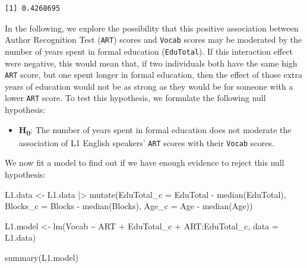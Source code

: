 \documentclass[
  letterpaper,
  DIV=11,
  numbers=noendperiod]{scrreprt}
\newenvironment{Shaded}{\begin{snugshade}}{\end{snugshade}}
\newcommand{\AttributeTok}[1]{\textcolor[rgb]{0.40,0.45,0.13}{#1}}
\newcommand{\FunctionTok}[1]{\textcolor[rgb]{0.28,0.35,0.67}{#1}}
\newcommand{\NormalTok}[1]{\textcolor[rgb]{0.00,0.23,0.31}{#1}}
\newcommand{\OtherTok}[1]{\textcolor[rgb]{0.00,0.23,0.31}{#1}}
\newcommand{\SpecialCharTok}[1]{\textcolor[rgb]{0.37,0.37,0.37}{#1}}
\providecommand{\tightlist}{%
  \setlength{\itemsep}{0pt}\setlength{\parskip}{0pt}}
\newcommand*\circled[1]{\tikz[baseline=(char.base)]{
          \node[shape=circle,draw,inner sep=1pt] (char) {{\scriptsize#1}};}}
\begin{document}
\begin{Shaded}
\end{Shaded}

\begin{verbatim}
[1] 0.4268695
\end{verbatim}

In the following, we explore the possibility that this positive
association between Author Recognition Test (\texttt{ART}) scores and
\texttt{Vocab} scores may be moderated by the number of years spent in
formal education (\texttt{EduTotal}). If this interaction effect were
negative, this would mean that, if two individuals both have the same
high \texttt{ART} score, but one spent longer in formal education, then
the effect of those extra years of education would not be as strong as
they would be for someone with a lower \texttt{ART} score. To test this
hypothesis, we formulate the following null hypothesis:

\begin{itemize}
\tightlist
\item
  \textbf{H\textsubscript{0}}: The number of years spent in formal
  education does not moderate the association of L1 English speakers'
  \texttt{ART} scores with their \texttt{Vocab} scores.
\end{itemize}

We now fit a model to find out if we have enough evidence to reject this
null hypothesis:

\protect{}\label{annotated-cell-280}%
\begin{Shaded}
\begin{Highlighting}[]
\NormalTok{L1.data }\OtherTok{\textless{}{-}}\NormalTok{ L1.data }\SpecialCharTok{|\textgreater{}} \hspace*{\fill}\NormalTok{\circled{1}}
   \FunctionTok{mutate}\NormalTok{(}\AttributeTok{EduTotal\_c =}\NormalTok{ EduTotal }\SpecialCharTok{{-}} \FunctionTok{median}\NormalTok{(EduTotal),}
          \AttributeTok{Blocks\_c =}\NormalTok{ Blocks }\SpecialCharTok{{-}} \FunctionTok{median}\NormalTok{(Blocks),}
          \AttributeTok{Age\_c =}\NormalTok{ Age }\SpecialCharTok{{-}} \FunctionTok{median}\NormalTok{(Age))}

\NormalTok{L1.model }\OtherTok{\textless{}{-}} \FunctionTok{lm}\NormalTok{(Vocab }\SpecialCharTok{\textasciitilde{}}\NormalTok{ ART }\SpecialCharTok{+}\NormalTok{ EduTotal\_c }\SpecialCharTok{+}\NormalTok{ ART}\SpecialCharTok{:}\NormalTok{EduTotal\_c, }\hspace*{\fill}\NormalTok{\circled{2}}
              \AttributeTok{data =}\NormalTok{ L1.data) }

\FunctionTok{summary}\NormalTok{(L1.model) }\hspace*{\fill}\NormalTok{\circled{3}}
\end{Highlighting}
\end{Shaded}
\end{document}
